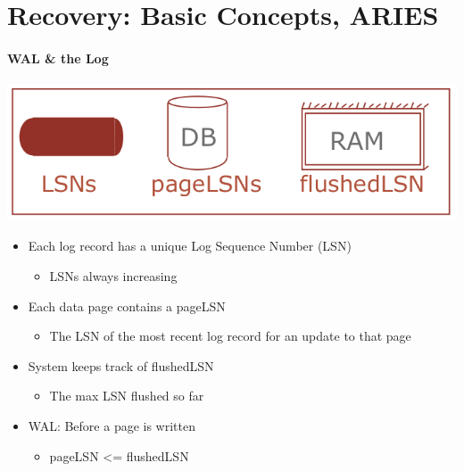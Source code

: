 \section{Recovery: Basic Concepts, ARIES}

\paragraph{WAL \& the Log}

\includegraphics[scale=0.2]{graphics/log-components.png}

\begin{itemize}
\item Each log record has a unique Log Sequence Number (LSN)
  \begin{itemize}
  \item LSNs always increasing
  \end{itemize}

\item Each data page contains a pageLSN
  \begin{itemize}
  \item The LSN of the most recent log record for an update
    to that page
  \end{itemize}

\item System keeps track of flushedLSN
  \begin{itemize}
  \item The max LSN flushed so far
  \end{itemize}

\item WAL: Before a page is written
  \begin{itemize}
  \item pageLSN <= flushedLSN
  \end{itemize}
\end{itemize}

